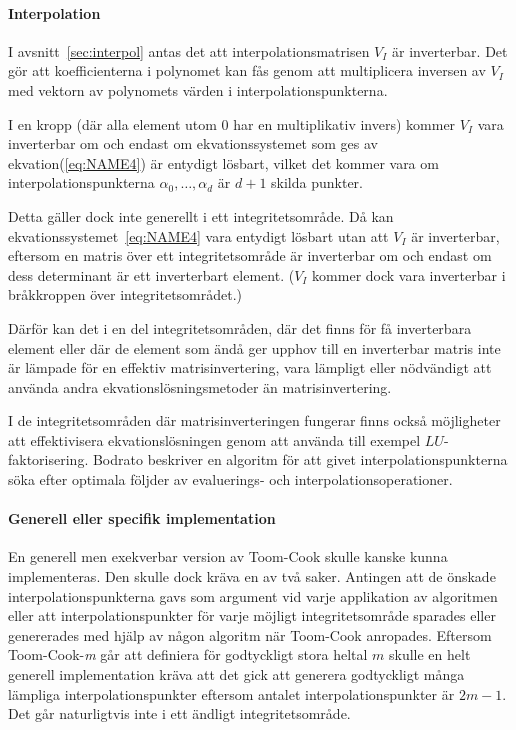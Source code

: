 \paragraph{Interpolation}
I avsnitt~\ref{sec:interpol} antas det att interpolationsmatrisen
$V_I$ är inverterbar. Det gör att koefficienterna i polynomet kan fås genom att
multiplicera inversen av $V_I$ med vektorn av polynomets värden i
interpolationspunkterna.

I en kropp (där alla element utom 0 har en multiplikativ invers) kommer $V_I$
vara inverterbar om och endast om ekvationssystemet som ges av ekvation(\ref{eq:NAME4})
är entydigt lösbart, vilket det kommer vara om interpolationspunkterna
$\alpha_0, \dots, \alpha_d$ är $d + 1$ skilda punkter.

Detta gäller dock inte generellt i ett integritetsområde. Då kan
ekvationssystemet~\ref{eq:NAME4} vara entydigt lösbart utan att $V_I$ är
inverterbar, eftersom en matris över ett integritetsområde är inverterbar om
och endast om dess determinant är ett inverterbart
element\cite{sombatboriboon2011some}. ($V_I$ kommer dock vara inverterbar i
bråkkroppen över integritetsområdet.)

Därför kan det i en del integritetsområden, där det finns för få inverterbara element
eller där de element som ändå ger upphov till en inverterbar matris inte är
lämpade för en effektiv matrisinvertering, vara lämpligt eller nödvändigt att
använda andra ekvationslösningsmetoder än matrisinvertering.


I de integritetsområden där matrisinverteringen fungerar finns också
möjligheter att effektivisera ekvationslösningen genom att använda till exempel
$LU$-faktorisering. Bodrato\cite{bodrato2007towards}\cite{bodrato2007integer}
beskriver en algoritm för att givet interpolationspunkterna söka efter optimala
följder av evaluerings- och interpolationsoperationer.

\paragraph{Generell eller specifik implementation}
En generell men exekverbar version av Toom-Cook skulle kanske kunna
implementeras. Den skulle dock kräva en av två saker. Antingen att de önskade
interpolationspunkterna gavs som argument vid varje applikation av algoritmen
eller att interpolationspunkter för varje möjligt integritetsområde sparades
eller genererades med hjälp av någon algoritm när Toom-Cook anropades. Eftersom
Toom-Cook-\emph{m} går att definiera för godtyckligt stora heltal $m$ skulle en
helt generell implementation kräva att det gick att generera godtyckligt många
lämpliga interpolationspunkter eftersom antalet interpolationspunkter är $2m-1$.
Det går naturligtvis inte i ett ändligt integritetsområde.

